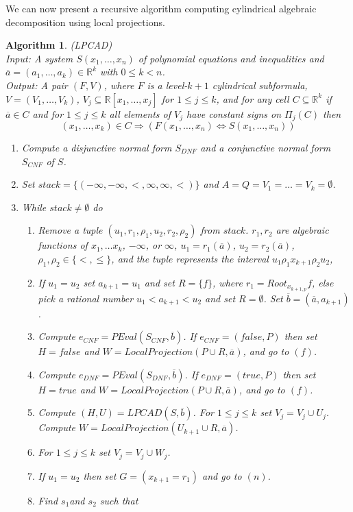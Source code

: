 \documentclass[english]{amsart}
\numberwithin{equation}{section}
\numberwithin{figure}{section}
\newtheorem{algorithm}[thm]{Algorithm}
\begin{document}
We can now present a recursive algorithm computing cylindrical algebraic
decomposition using local projections.
\begin{algorithm}
\label{alg:LPCAD}(LPCAD)\\
Input:\emph{ A system $S(x_{1},\ldots,x_{n})$} \emph{of polynomial
equations and inequalities and $\overline{a}=(a_{1},\ldots,a_{k})\in\mathbb{R}^{k}$
with $0\leq k<n$.}\textup{}\\
\textup{\emph{Output:}}\textup{ }\emph{A pair $(F,V)$, where $F$
is a level-$k+1$ cylindrical subformula, }\textup{$V=(V_{1},\ldots,V_{k})$}\emph{,
}\textup{$V_{j}\subseteq\mathbb{R}[x_{1},\ldots,x_{j}]$}\emph{ for
$1\leq j\leq k$, and for any cell $C\subseteq\mathbb{R}^{k}$ if
$\overline{a}\in C$ and for $1\leq j\leq k$ all elements of $V_{j}$
have constant signs on $\Pi_{j}(C)$ then}\textup{\emph{ }}\textup{\[
(x_{1},\ldots,x_{k})\in C\Rightarrow\left(F(x_{1},\ldots,x_{n})\Longleftrightarrow S(x_{1},\ldots,x_{n})\right)\]
}
\begin{enumerate}
\item Compute a disjunctive normal form $S_{DNF}$ and a conjunctive normal
form $S_{CNF}$ of $S$.
\item Set $stack=\{(-\infty,-\infty,<,\infty,\infty,<)\}$ and $A=Q=V_{1}=\ldots=V_{k}=\emptyset$.
\item While $stack\neq\emptyset$ do

\begin{enumerate}
\item Remove a tuple $(u_{1},r_{1},\rho_{1},u_{2},r_{2},\rho_{2})$ from
$stack$. $r_{1},r_{2}$ are algebraic functions of $x_{1},\ldots x_{k}$,
$-\infty$, or $\infty$, $u_{1}=r_{1}(\overline{a})$, $u_{2}=r_{2}(\overline{a})$,
$\rho_{1},\rho_{2}\in\{<,\leq\}$, and the tuple represents the interval
$u_{1}\rho_{1}x_{k+1}\rho_{2}u_{2}$,
\item If $u_{1}=u_{2}$ set $a_{k+1}=u_{1}$ and set $R=\{f\}$, where $r_{1}=Root_{x_{k+1,p}}f$,
else pick a rational number $u_{1}<a_{k+1}<u_{2}$ and set $R=\emptyset$.
Set $\overline{b}=(\overline{a},a_{k+1})$.
\item Compute $e_{CNF}=PEval(S_{CNF},\overline{b})$. If $e_{CNF}=(false,P)$
then set $H=false$ and $W=LocalProjection(P\cup R,\overline{a})$,
and go to $(f)$.
\item Compute $e_{DNF}=PEval(S_{DNF},\overline{b})$. If $e_{DNF}=(true,P)$
then set $H=true$ and $W=LocalProjection(P\cup R,\overline{a})$,
and go to $(f)$.
\item Compute $(H,U)=LPCAD(S,\overline{b})$. For $1\leq j\leq k$ set $V_{j}=V_{j}\cup U_{j}$.
Compute $W=LocalProjection(U_{k+1}\cup R,\overline{a})$.
\item For $1\leq j\leq k$ set $V_{j}=V_{j}\cup W_{j}$.
\item If $u_{1}=u_{2}$ then set $G=(x_{k+1}=r_{1})$ and go to $(n)$.
\item Find $s_{1}$and $s_{2}$ such that 


\end{enumerate}
\end{enumerate}
\end{algorithm}
\end{document}
